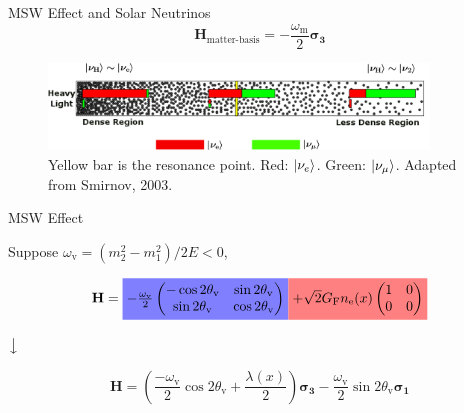 \documentclass[9pt]{beamer}
\begin{document}
\begin{darkframes}
\begin{frame}{MSW Effect and Solar Neutrinos}
\begin{equation*}
    \mathbf{H}_{\text{matter-basis}} = -\frac{\omega_{\mathrm m}}{2}\boldsymbol{\sigma_3}
\end{equation*}



\begin{figure}
\centering
\includegraphics[width=0.9\textwidth]{assets/msw-and-density.png}
\caption*{Yellow bar is the resonance point. Red: $\left| \nu_e\right\rangle$. Green: $\left| \nu_\mu\right\rangle$. Adapted from Smirnov, 2003.}
\end{figure}



\end{frame}






\begin{frame}{MSW Effect}


Suppose $\omega_{\mathrm v} = (m_2^2 - m_1^2)/2E <0$,

\begin{equation*}
    \mathbf{H} = \colorbox{blue!50}{$
    -\frac{\omega_{\mathrm{v}}}{2}\begin{pmatrix} -\cos 2\theta_{\mathrm{v}} & \sin 2 \theta_{\mathrm{v}} \\ \sin 2\theta_{\mathrm{v}} & \cos 2\theta_{\mathrm{v}}  \end{pmatrix}
    $}
             \colorbox{red!50}{$
            + \sqrt{2}G_{\mathrm{F}} n_{\mathrm{e}}(x) \begin{pmatrix}
            1 & 0 \\
            0 & 0
            \end{pmatrix}
            $}
\end{equation*}

\centering
$\big\downarrow$

\begin{equation*}
    \mathbf{H} =
    \left(
     \frac{-\omega_{\mathrm{v}}}{2} \cos 2\theta_{\mathrm{v}}
    + \frac{\lambda(x)}{2}
    \right) \boldsymbol{\sigma_3}
            - \frac{\omega_{\mathrm v}}{2}\sin 2\theta_{\mathrm v} \boldsymbol{\sigma_1}
\end{equation*}


\end{frame}
\end{darkframes}
\end{document}
